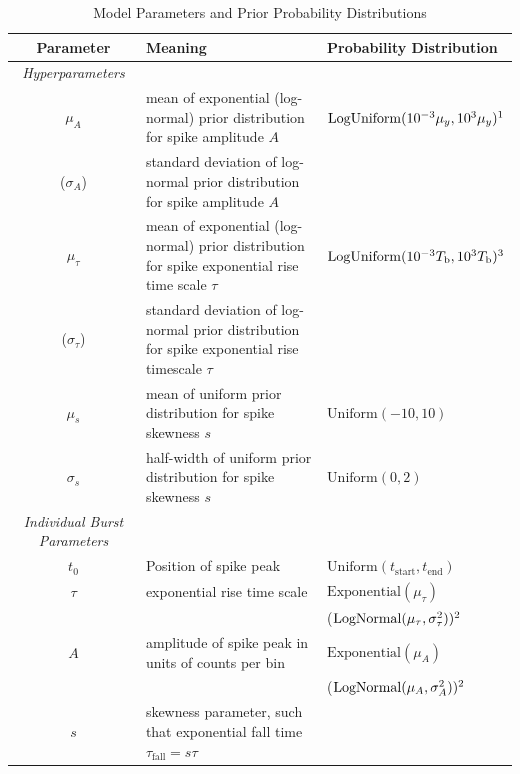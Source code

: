 \documentclass[12pt]{emulateapj}
\newcommand{\counts}{y}
\begin{document}
\begin{table}[htbp]
\renewcommand{\arraystretch}{1.3}
\footnotesize
\caption{Model Parameters and Prior Probability Distributions}
\begin{tabular*}{\textwidth}{@{\extracolsep{\fill}} cll}%
\toprule
\bf{Parameter} & \bf{Meaning} & \bf{Probability Distribution} \\ \midrule
\it{Hyperparameters} && \\ \midrule
$\mu_A$ & mean of exponential (log-normal) prior distribution for spike amplitude $A$ &  $\mathrm{LogUniform}(10^{-3}\mu_\counts, 10^3\mu_\counts)\footnotemark[1]$  \\
($\sigma_A$)\footnotemark[2] & standard deviation of log-normal prior distribution for spike amplitude $A$ & \\
$\mu_\tau$ & mean of exponential (log-normal) prior distribution for spike exponential rise time scale $\tau$& $\mathrm{LogUniform}(10^{-3}T_\mathrm{b}, 10^3{T_\mathrm{b}})\footnotemark[3]$  \\
($\sigma_\tau$)\footnotemark[2]  &standard deviation of log-normal prior distribution for spike exponential rise timescale $\tau$& \\
$\mu_s$ & mean of uniform prior distribution for spike skewness $s$ & $\mathrm{Uniform}(-10, 10)$ \\
$\sigma_s$ & half-width of uniform prior distribution for spike skewness $s$& $\mathrm{Uniform}(0,2)$\\ \midrule
\it{Individual Burst Parameters} && \\ \midrule
$t_0$ & Position of spike peak & $\mathrm{Uniform}(t_{\mathrm{start}}, t_{\mathrm{end}})$ \\
$\tau$ & exponential rise time scale & $\mathrm{Exponential}(\mu_\tau)$ \\
 && ($\mathrm{LogNormal}(\mu_\tau, \sigma^2_{\tau}))\footnotemark[2] $ \\
$A$ & amplitude of spike peak in units of counts per bin &$\mathrm{Exponential}(\mu_A)$ \\
 && ($\mathrm{LogNormal}(\mu_A, \sigma^2_{A}))\footnotemark[2] $ \\ 
$s$ & skewness parameter, such that exponential fall time $\tau_{\mathrm{fall}} = s\tau$ & \\

\end{tabular*}
\end{table}
\end{document}
